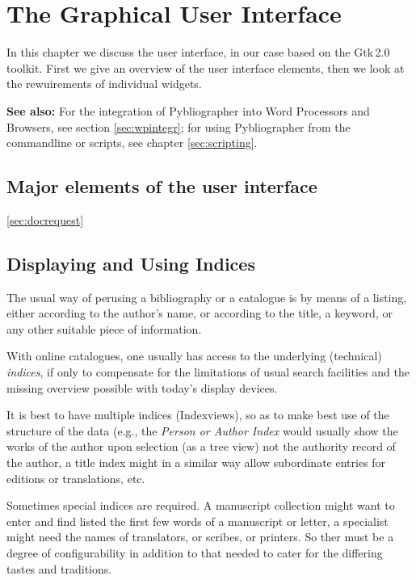 \section{The Graphical User Interface}
\label{sec:gui}


In this chapter we discuss the user interface, in our case based on
the \textsf{Gtk\,2.0} toolkit. First we give an overview of the user
interface elements, then we look at the rewuirements of individual
widgets.

\textbf{See also:} For the integration of Pybliographer into Word
Processors and Browsers, see section \ref{sec:wpintegr}; for using
Pybliographer from the commandline or scripts, see chapter
\ref{sec:scripting}.



\subsection{Major elements of the user interface}
\label{sec:guimajor}


\ref{sec:docrequest}




\subsection{Displaying and Using Indices}
\label{sec:guiindex}


The usual way of perusing a bibliography or a catalogue is by means of
a listing, either according to the author's name, or according to the
title, a keyword, or any other suitable piece of information. 

With online catalogues, one usually has access to the underlying
(technical) \textit{indices}, if only to compensate for the
limitations of usual search facilities and the missing overview
possible with today's display devices. 

It is best to have multiple indices (Indexviews), so as to make best
use of the structure of the data (e.g., the \textit{Person or Author
  Index} would usually show the works of the author upon selection (as
a tree view) not the authority record of the author, a title index
might in a similar way allow subordinate entries for editions or
translations, etc. 

Sometimes special indices are required. A manuscript collection might
want to enter and find listed the first few words of a manuscript or
letter, a specialist might need the names of translators, or scribes,
or printers. So ther must be a degree of configurability in addition
to that needed to cater for the differing tastes and traditions.

